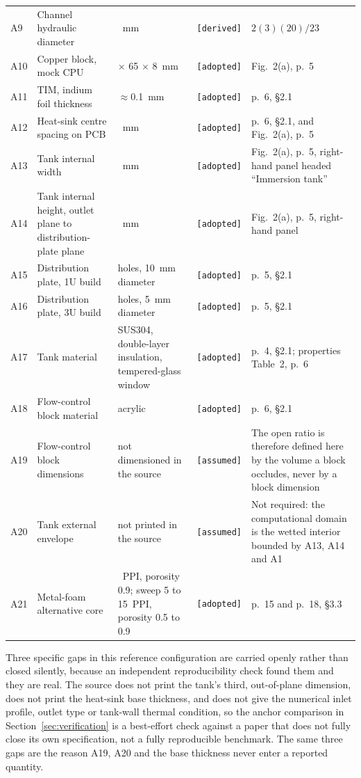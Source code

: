 \begin{longtable}{@{}l>{\raggedright\arraybackslash}p{}>{\raggedright\arraybackslash}p{}l>{\raggedright\arraybackslash}p{}@{}}
A9  & Channel hydraulic diameter      & 5.217~mm & \texttt{[derived]} & $2(3)(20)/23$ \\
A10 & Copper block, mock CPU          & 50 $\times$ 65 $\times$ 8~mm & \texttt{[adopted]} & Fig.~2(a), p.~5 \\
A11 & TIM, indium foil thickness      & $\approx$0.1~mm & \texttt{[adopted]} & p.~6, \S2.1 \\
A12 & Heat-sink centre spacing on PCB & 60~mm    & \texttt{[adopted]} & p.~6, \S2.1, and Fig.~2(a), p.~5 \\
A13 & Tank internal width             & 423~mm   & \texttt{[adopted]} & Fig.~2(a), p.~5, right-hand panel headed ``Immersion tank'' \\
A14 & Tank internal height, outlet plane to distribution-plate plane & 430~mm & \texttt{[adopted]} & Fig.~2(a), p.~5, right-hand panel \\
A15 & Distribution plate, 1U build    & 10 holes, 10~mm diameter & \texttt{[adopted]} & p.~5, \S2.1 \\
A16 & Distribution plate, 3U build    & 30 holes, 5~mm diameter & \texttt{[adopted]} & p.~5, \S2.1 \\
A17 & Tank material                   & SUS304, double-layer insulation, tempered-glass window & \texttt{[adopted]} & p.~4, \S2.1; properties Table~2, p.~6 \\
A18 & Flow-control block material     & acrylic  & \texttt{[adopted]} & p.~6, \S2.1 \\
A19 & Flow-control block dimensions   & not dimensioned in the source & \texttt{[assumed]} & The open ratio is therefore defined here by the volume a block occludes, never by a block dimension \\
A20 & Tank external envelope          & not printed in the source & \texttt{[assumed]} & Not required: the computational domain is the wetted interior bounded by A13, A14 and A1 \\
A21 & Metal-foam alternative core     & 10~PPI, porosity 0.9; sweep 5 to 15~PPI, porosity 0.5 to 0.9 & \texttt{[adopted]} & p.~15 and p.~18, \S3.3 \\
\end{longtable}
\endgroup

Three specific gaps in this reference configuration are carried openly rather than closed
silently, because an independent reproducibility check found them and they are real. The source
does not print the tank's third, out-of-plane dimension, does not print the heat-sink base
thickness, and does not give the numerical inlet profile, outlet type or tank-wall thermal
condition, so the anchor comparison in Section~\ref{sec:verification} is a best-effort check
against a paper that does not fully close its own specification, not a fully reproducible
benchmark. The same three gaps are the reason A19, A20 and the base thickness never enter a
reported quantity.

